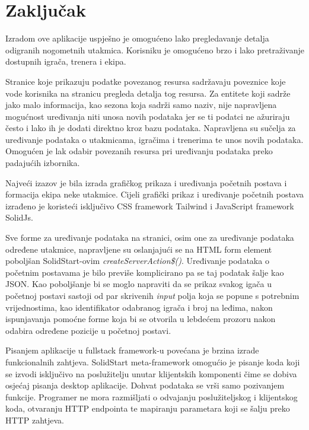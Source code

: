 \documentclass[times, utf8, zavrsni]{fer}
\begin{document}
\chapter{Zaključak}

Izradom ove aplikacije uspješno je omogućeno lako pregledavanje detalja odigranih nogometnih utakmica.
Korisniku je omogućeno brzo i lako pretraživanje dostupnih igrača, trenera i ekipa.

Stranice koje prikazuju podatke povezanog resursa sadržavaju poveznice koje vode korisnika na stranicu pregleda detalja tog resursa.
Za entitete koji sadrže jako malo informacija, kao sezona koja sadrži samo naziv, nije napravljena mogućnost uređivanja niti unosa novih podataka jer se ti podatci ne ažuriraju često i lako ih je dodati direktno kroz bazu podataka.
Napravljena su sučelja za uređivanje podataka o utakmicama, igračima i trenerima te unos novih podataka.
Omogućen je lak odabir povezanih resursa pri uređivanju podataka preko padajućih izbornika.

Najveći izazov je bila izrada grafičkog prikaza i uređivanja početnih postava i formacija ekipa neke utakmice.
Cijeli grafički prikaz i uređivanje početnih postava izrađeno je koristeći isključivo CSS framework Tailwind i JavaScript framework SolidJs.

Sve forme za uređivanje podataka na stranici, osim one za uređivanje podataka određene utakmice, napravljene su oslanjajući se na HTML form element poboljšan SolidStart-ovim \emph{createServerAction\$()}.
Uređivanje podataka o početnim postavama je bilo previše komplicirano pa se taj podatak šalje kao JSON.
Kao poboljšanje bi se moglo napraviti da se prikaz svakog igača u početnoj postavi sastoji od par skrivenih \emph{input} polja koja se popune s potrebnim vrijednostima, kao identifikator odabranog igrača i broj na leđima,
nakon ispunjavanja pomoćne forme koja bi se otvorila u lebdećem prozoru nakon odabira određene pozicije u početnoj postavi.

Pisanjem aplikacije u fullstack framework-u povećana je brzina izrade funkcionalnih zahtjeva.
SolidStart meta-framework omogućio je pisanje koda koji se izvodi isključivo na poslužitelju unutar klijentskih komponenti čime se dobiva osjećaj pisanja desktop aplikacije.
Dohvat podataka se vrši samo pozivanjem funkcije. Programer ne mora razmišljati o odvajanju poslužiteljskog i klijentskog koda, otvaranju HTTP endpointa te mapiranju parametara koji se šalju preko HTTP zahtjeva.



\end{document}

